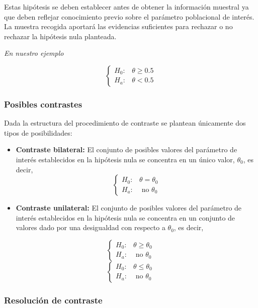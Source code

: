 \documentclass[
]{book}
\begin{document}
Estas hipótesis se deben establecer antes de obtener la información muestral ya que deben reflejar conocimiento previo sobre el parámetro poblacional de interés. La muestra recogida aportará las evidencias suficientes para rechazar o no rechazar la hipótesis nula planteada.

\emph{En nuestro ejemplo}

\[\left\{\begin{array}{ll} H_0: & \theta \geq 0.5\\ H_a: & \theta < 0.5\end{array}\right.\]

\hypertarget{posibles-contrastes}{%
\subsubsection{Posibles contrastes}\label{posibles-contrastes}}

Dada la estructura del procedimiento de contraste se plantean únicamente dos tipos de posibilidades:

\begin{itemize}
\item
  \textbf{Contraste bilateral:} El conjunto de posibles valores del parámetro de interés establecidos en la hipótesis nula se concentra en un único valor, \(\theta_0\), es decir, \[\left\{\begin{array}{ll} H_0: & \theta = \theta_0\\ H_a: & \text{ no } \theta_0 \end{array}\right.\]
\item
  \textbf{Contraste unilateral:} El conjunto de posibles valores del parámetro de interés establecidos en la hipótesis nula se concentra en un conjunto de valores dado por una desigualdad con respecto a \(\theta_0\), es decir,
\end{itemize}

\[\left\{\begin{array}{ll} H_0: & \theta \geq \theta_0\\ H_a: & \text{ no } \theta_0 \end{array}\right.\] \[\left\{\begin{array}{ll} H_0: & \theta \leq \theta_0\\ H_a: & \text{ no } \theta_0 \end{array}\right.\]

\hypertarget{resoluciuxf3n-de-contraste}{%
\subsubsection{Resolución de contraste}\label{resoluciuxf3n-de-contraste}}
\end{document}
